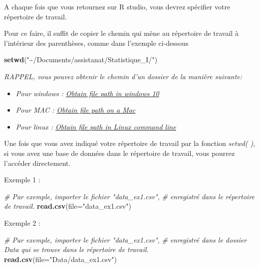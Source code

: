 \documentclass[
]{book}
\newenvironment{Shaded}{\begin{snugshade}}{\end{snugshade}}
\newcommand{\AttributeTok}[1]{\textcolor[rgb]{0.13,0.29,0.53}{#1}}
\newcommand{\CommentTok}[1]{\textcolor[rgb]{0.56,0.35,0.01}{\textit{#1}}}
\newcommand{\FunctionTok}[1]{\textcolor[rgb]{0.13,0.29,0.53}{\textbf{#1}}}
\newcommand{\NormalTok}[1]{#1}
\newcommand{\StringTok}[1]{\textcolor[rgb]{0.31,0.60,0.02}{#1}}
\begin{document}
A chaque fois que vous retournez sur R studio, vous devrez spécifier votre répertoire de travail.

Pour ce faire, il suffit de copier le chemin qui mène au répertoire de travail à l'intérieur des parenthèses, comme dans l'exemple ci-dessous

\begin{Shaded}
\begin{Highlighting}[]
\FunctionTok{setwd}\NormalTok{(}\StringTok{"\textasciitilde{}/Documents/assistanat/Statistique\_I/"}\NormalTok{)}
\end{Highlighting}
\end{Shaded}

\emph{RAPPEL, vous pouvez obtenir le chemin d'un dossier de la manière suivante:}

\begin{itemize}
\item
  \emph{Pour windows : \href{https://www.supportyourtech.com/articles/how-to-get-file-path-windows-10-easy-steps-to-find-your-file-locations/}{Obtain file path in windows 10}}
\item
  \emph{Pour MAC : \href{https://macpaw.com/how-to/get-file-path-mac}{Obtain file path on a Mac}}
\item
  \emph{Pour linux : \href{https://linuxhandbook.com/get-file-path/}{Obtain file path in Linux command line}}
\end{itemize}

Une fois que vous avez indiqué votre répertoire de travail par la fonction \emph{setwd( )}, si vous avez une base de données dans le répertoire de travail, vous pourrez l'accéder directement.

Exemple 1 :

\begin{Shaded}
\begin{Highlighting}[]
\CommentTok{\# Par exemple, importer le fichier "data\_ex1.csv", }
\CommentTok{\# enregistré dans le répertoire de travail.}
\FunctionTok{read.csv}\NormalTok{(}\AttributeTok{file=}\StringTok{"data\_ex1.csv"}\NormalTok{)}
\end{Highlighting}
\end{Shaded}

Exemple 2 :

\begin{Shaded}
\begin{Highlighting}[]

\CommentTok{\# Par exemple, importer le fichier "data\_ex1.csv", }
\CommentTok{\# enregistré dans le dossier Data qui se trouve dans le répertoire de travail.}
\FunctionTok{read.csv}\NormalTok{(}\AttributeTok{file=}\StringTok{"Data/data\_ex1.csv"}\NormalTok{)}
\end{Highlighting}
\end{Shaded}
\end{document}
